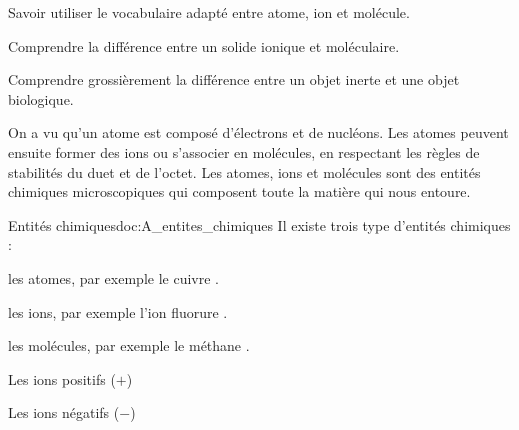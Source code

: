 \teteSndMole

\vspace*{-32pt}


\begin{objectifs}
  \item Savoir utiliser le vocabulaire adapté entre atome, ion et molécule.
  \item Comprendre la différence entre un solide ionique et moléculaire.
  \item Comprendre grossièrement la différence entre un objet inerte et une objet biologique.
\end{objectifs}

\begin{contexte}
  On a vu qu'un atome est composé d'électrons et de nucléons.
  Les atomes peuvent ensuite former des ions ou s'associer en molécules, en respectant les règles de stabilités du duet et de l'octet.
  Les atomes, ions et molécules sont des entités chimiques microscopiques qui composent toute la matière qui nous entoure.

  
  
\end{contexte}



\begin{doc}{Entités chimiques}{doc:A_entites_chimiques}
  Il existe trois type d'entités chimiques :
  \begin{listePoints}
    \item les atomes, par exemple le cuivre .
    \item les ions, par exemple l'ion fluorure .
    \item les molécules, par exemple le méthane .
  \end{listePoints}
  
  \begin{importants}
    Les ions positifs ($+$) 
    
    Les ions négatifs ($-$) 
  \end{importants}
\end{doc}

